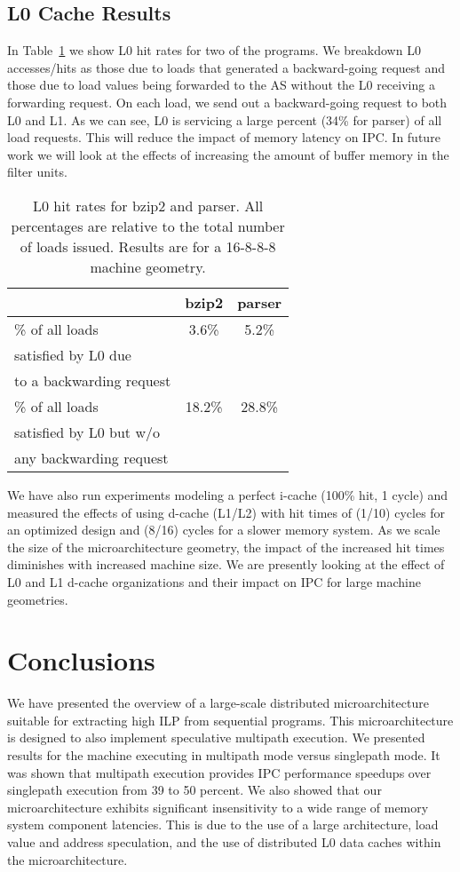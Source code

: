 \documentclass[10pt,twocolumn,dvips]{article}
\begin{document}
\subsection{L0 Cache Results}
%
In Table~\ref{tab:L0stats} we show L0 hit rates for two of the programs.
We breakdown L0 accesses/hits as those due to loads that generated
a backward-going request and those due to load values being forwarded
to the AS without the L0 receiving a forwarding request.
On each load, we send out a backward-going request to both L0 and L1. 
As we can see, L0 is servicing a large percent (34\% for parser)
of all load requests.  This will reduce the impact of memory latency on 
IPC.  In future work we will look at the effects of
increasing the amount of buffer memory
in the filter units. 
%
\begin{table}
\scriptsize{
\begin{center}
\caption{L0 hit rates for bzip2 and parser. All percentages are relative
to the total number of loads issued. Results are for a 16-8-8-8 
machine geometry.} 
\label{tab:L0stats}
\begin{tabular}{|l|c|c|}
\hline 
& bzip2 &
parser \\
\hline
\hline 
\% of all loads & 3.6\% & 5.2\% \\
satisfied by L0 due & & \\
to a backwarding request & & \\
\hline 
\% of all loads & 18.2\% & 28.8\% \\
satisfied by L0 but w/o & & \\
any backwarding request & & \\
\hline
\end{tabular}
\end{center}
}
\end{table}

We have also run experiments modeling a perfect i-cache
(100\% hit, 1 cycle)
and measured the effects of using d-cache (L1/L2) with hit times
of (1/10) cycles for an optimized design and (8/16) cycles for a
slower memory system.  
As we scale the size of the microarchitecture geometry,  
the impact of the increased hit times diminishes 
with increased machine size.  We are presently looking at
the effect of L0 and L1 d-cache organizations and their impact
on IPC for large machine geometries.
%
%
\section{Conclusions}
%
We have presented the overview of a large-scale distributed 
microarchitecture suitable for extracting high ILP from
sequential programs.
This microarchitecture is designed to also implement 
speculative multipath execution.  We presented results
for the machine executing in  
multipath mode versus singlepath mode.
It was shown that multipath execution provides IPC performance speedups
over singlepath execution from 39 to 50 percent.
We also showed that our microarchitecture exhibits significant
insensitivity to a wide range of memory system component latencies.
This is due to the use of a large architecture, load value and
address speculation, and the use of distributed
L0 data caches within the microarchitecture.
%


%
\end{document}
